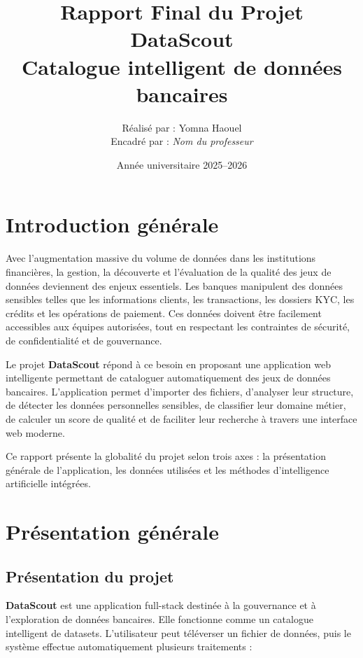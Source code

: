 \documentclass[12pt,a4paper]{report}
\title{\textbf{Rapport Final du Projet DataScout}\\
\large Catalogue intelligent de données bancaires}
\author{Réalisé par : Yomna Haouel \\
Encadré par : \textit{Nom du professeur}}
\date{Année universitaire 2025--2026}
\begin{document}
\maketitle
\tableofcontents
\newpage

\chapter*{Introduction générale}

Avec l'augmentation massive du volume de données dans les institutions financières, la gestion, la découverte et l'évaluation de la qualité des jeux de données deviennent des enjeux essentiels. Les banques manipulent des données sensibles telles que les informations clients, les transactions, les dossiers KYC, les crédits et les opérations de paiement. Ces données doivent être facilement accessibles aux équipes autorisées, tout en respectant les contraintes de sécurité, de confidentialité et de gouvernance.

Le projet \textbf{DataScout} répond à ce besoin en proposant une application web intelligente permettant de cataloguer automatiquement des jeux de données bancaires. L'application permet d'importer des fichiers, d'analyser leur structure, de détecter les données personnelles sensibles, de classifier leur domaine métier, de calculer un score de qualité et de faciliter leur recherche à travers une interface web moderne.

Ce rapport présente la globalité du projet selon trois axes : la présentation générale de l'application, les données utilisées et les méthodes d'intelligence artificielle intégrées.

\chapter{Présentation générale}

\section{Présentation du projet}

\textbf{DataScout} est une application full-stack destinée à la gouvernance et à l'exploration de données bancaires. Elle fonctionne comme un catalogue intelligent de datasets. L'utilisateur peut téléverser un fichier de données, puis le système effectue automatiquement plusieurs traitements :
\end{document}
